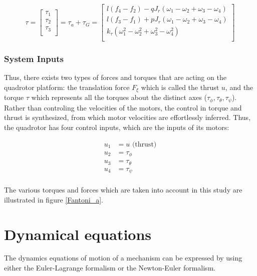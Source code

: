 \documentclass{thesisreport}
\begin{document}
\begin{equation}\label{total_torque_equation}
\tau = \begin{bmatrix}
\tau_1\\
\tau_2\\
\tau_3\\
\end{bmatrix} = \tau_a + \tau_G = \begin{bmatrix}
l(f_4-f_2) - qJ_r(\omega_1-\omega_2+\omega_3-\omega_4)\\
l(f_3-f_1) + pJ_r(\omega_1-\omega_2+\omega_3-\omega_4)\\
k_{\tau}(\omega_1^2-\omega_2^2+\omega_3^2-\omega_4^2)\\
\end{bmatrix}
\end{equation}

\subsubsection*{System Inputs}

Thus, there exists two types of forces and torques that are acting on the quadrotor platform: the translation force $F_{\xi}$ which is called the thrust $u$, and the torque $\tau$ which represents all the torques about the distinct axes ($\tau_{\phi}, \tau_{\theta}, \tau_{\psi} $). \\
Rather than controling the velocities of the motors, the control in torque and thrust is synthesized, from which motor velocities are effortlessly inferred. Thus, the quadrotor has four control inputs, which are the inputs of its motors:

\begin{align*}
u_1 &= u \text{ (thrust)} \\
u_2 &= \tau_{\phi}\\
u_3 &= \tau_{\theta}\\
u_4 &= \tau_{\psi}\\
\end{align*}

The various torques and forces which are taken into account in this study are illustrated in figure \ref{Fantoni_a}.

\newpage

\section{Dynamical equations}

The dynamics equations of motion of a mechanism can be expressed by using either the Euler-Lagrange formalism or the Newton-Euler formalism.
\end{document}
